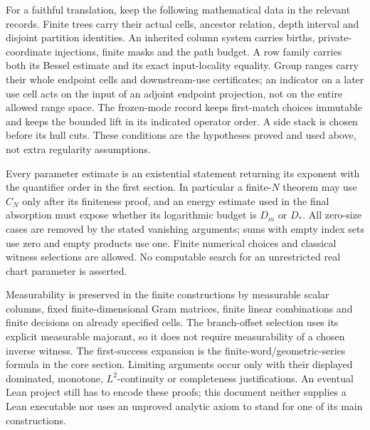 \documentclass[11pt]{article}
\theoremstyle{definition}
\numberwithin{equation}{section}
\begin{document}
For a faithful translation, keep the following mathematical data in the relevant records. Finite trees carry their actual cells, ancestor relation, depth interval and disjoint partition identities. An inherited column system carries births, private-coordinate injections, finite masks and the path budget. A row family carries both its Bessel estimate and its exact input-locality equality. Group ranges carry their whole endpoint cells and downstream-use certificates; an indicator on a later use cell acts on the input of an adjoint endpoint projection, not on the entire allowed range space. The frozen-mode record keeps first-match choices immutable and keeps the bounded lift in its indicated operator order. A side stack is chosen before its hull cuts. These conditions are the hypotheses proved and used above, not extra regularity assumptions.

Every parameter estimate is an existential statement returning its exponent with the quantifier order in the first section. In particular a finite-$N$ theorem may use $C_N$ only after its finiteness proof, and an energy estimate used in the final absorption must expose whether its logarithmic budget is $D_m$ or $D_*$. All zero-size cases are removed by the stated vanishing arguments; sums with empty index sets use zero and empty products use one. Finite numerical choices and classical witness selections are allowed. No computable search for an unrestricted real chart parameter is asserted.

Measurability is preserved in the finite constructions by measurable scalar columns, fixed finite-dimensional Gram matrices, finite linear combinations and finite decisions on already specified cells. The branch-offset selection uses its explicit measurable majorant, so it does not require measurability of a chosen inverse witness. The first-success expansion is the finite-word/geometric-series formula in the core section. Limiting arguments occur only with their displayed dominated, monotone, $L^2$-continuity or completeness justifications. An eventual Lean project still has to encode these proofs; this document neither supplies a Lean executable nor uses an unproved analytic axiom to stand for one of its main constructions.
\end{document}
